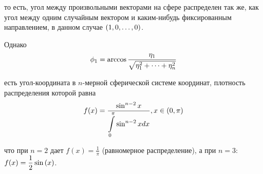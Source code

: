 то есть, угол между произвольными векторами на сфере распределен так же, как угол между одним случайным вектором и каким-нибудь фиксированным направлением, в данном случае $\left( 1, 0, \dots, 0 \right)$. \par
	Однако
\begin{gather}
		\phi_1 = \arccos \frac{ \eta_1 }{ \sqrt{ \eta_1^2 + \dots + \eta_n^2 }} \notag
\end{gather}

есть угол-координата в $n$-мерной сферической системе координат, плотность распределения которой равна
\begin{gather}
	f(x) = \frac{ \sin^{n-2} x }{ \displaystyle \int\limits_{0}^{\pi} \sin^{n-2} x dx }, x \in \left( 0, \pi \right) \notag
\end{gather}

что при $n = 2$ дает $f(x) = \displaystyle \frac{1}{\pi}$ (равномерное распределение), а при $n = 3$: $ f(x) = \displaystyle \frac{1}{2} \sin \left( x \right)$.
